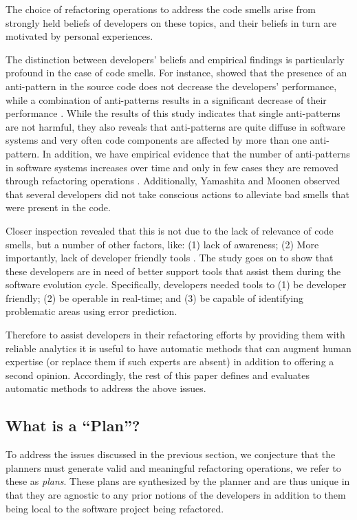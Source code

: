 \documentclass{sig-alternate}
\begin{document}
The choice of refactoring operations to address the code smells arise from strongly held beliefs of developers on these topics, and their beliefs in turn are motivated by personal experiences. 

The distinction between developers' beliefs and empirical findings is particularly profound in the case of code smells. For instance, \cite{abbes11} showed that the presence of an anti-pattern in the source code does not decrease the developers' performance, while a combination of anti-patterns results in a significant decrease of their performance \cite{abbes11}\cite{yama13}. While the results of this study indicates that single anti-patterns are not harmful, they also reveals that anti-patterns are quite diffuse in software systems and very often code components are affected by more than one anti-pattern. In addition, we have empirical evidence that the number of anti-patterns in software systems increases over time and only in few cases they are removed through refactoring operations \cite{arcoverde11}\cite{chatzigeorgiou10}. Additionally, Yamashita and Moonen\cite{} observed that several developers did not take conscious actions to alleviate bad smells that were present in the code. 

Closer inspection revealed that this is not due to the lack of relevance of code smells, but a number of other factors, like: (1) lack of awareness; (2) More importantly, lack of developer friendly tools \cite{}. The study goes on to show that these developers are in need of better support tools that assist them during the software evolution cycle.  Specifically, developers needed tools to (1) be developer friendly; (2) be operable in real-time; and (3) be capable of identifying problematic areas using error prediction.

Therefore to assist developers in their refactoring efforts by providing them with reliable analytics it is useful to have automatic methods that can augment human expertise (or replace them if such experts are absent) in addition to offering a second opinion. Accordingly, the rest of this paper defines and evaluates automatic methods to address the above issues.
  

\subsection{What is a ``Plan''?}
To address the issues discussed in the previous section, we conjecture that the planners must generate valid and meaningful refactoring operations, we refer to these as \textit{plans}. These plans are synthesized by the planner and are thus unique in that they are agnostic to any prior notions of the developers in addition to them being local to the software project being refactored.  
\end{document}
